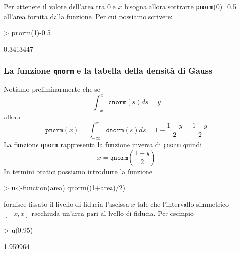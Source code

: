\documentclass[onecolumn,12pt]{book}
\begin{document}
Per ottenere il valore dell'area tra 0 e $x$ bisogna allora sottrarre \texttt{pnorm}(0)=0.5 all'area fornita dalla funzione.
Per cui possiamo scrivere:
\begin{Schunk}
\begin{Sinput}
> pnorm(1)-0.5
\end{Sinput}
\begin{Soutput}
[1] 0.3413447
\end{Soutput}
\end{Schunk}


 \subsubsection{La funzione \texttt{qnorm} e la tabella della densit\`a di Gauss}

Notiamo preliminarmente che
se $$ \int_{-x}^x \texttt{dnorm}(s)ds= y$$ allora
$$\texttt{pnorm}(x)=\int_{-\infty}^x \texttt{dnorm}(s)ds=1-\frac{1-y}{2}=\frac{1+y}{2}$$
 La funzione \texttt{qnorm} rappresenta la funzione inversa di \texttt{pnorm}  quindi
$$x=\texttt{qnorm}\left(\frac{1+y}{2}\right)$$
In termini pratici possiamo introdurre la funzione
\begin{Schunk}
\begin{Sinput}
> u<-function(area) qnorm((1+area)/2)
\end{Sinput}
\end{Schunk}
fornisce fissato il livello di fiducia l'ascissa $x$  tale che l'intervallo simmetrico $[-x,x]$ racchiuda un'area pari al lvello di fiducia. Per esempio
\begin{Schunk}
\begin{Sinput}
> u(0.95)
\end{Sinput}
\begin{Soutput}
[1] 1.959964
\end{Soutput}
\end{Schunk}
\end{document}
